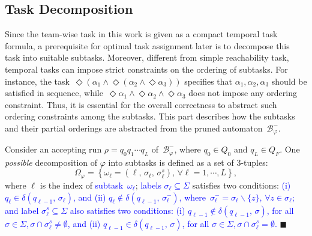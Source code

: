 \subsection{Task Decomposition}\label{subsubsec:task-decompose}
Since the team-wise task in this work is given as a compact temporal task formula,
a prerequisite for optimal task assignment later is to decompose this task into suitable subtasks.
Moreover, different from simple reachability task,
temporal tasks can impose strict constraints on the ordering of subtasks.
For instance, the task~$\Diamond (\alpha_1 \land \Diamond (\alpha_2 \land \Diamond\alpha_3)) $
specifies that $\alpha_1,\alpha_2,\alpha_3$ should be satisfied in sequence,
while~$\Diamond\alpha_1\land\Diamond\alpha_2\land\Diamond\alpha_3$ does not impose any ordering constraint.
Thus, it is essential for the overall correctness to abstract such ordering constraints among the subtasks.
This part describes how the subtasks and their partial orderings are abstracted from the pruned automaton~$\mathcal{B}_{\varphi}^{-}$.

\begin{definition} \label{def:subtasks}
Consider an accepting run $\rho=q_0q_1\cdots q_L$ of~$\mathcal{B}_{\varphi}^{-}$,
where $q_0\in Q_0$ and $q_L\in Q_F$.
One \emph{possible} decomposition of $\varphi$ into subtasks is defined
as a set of 3-tuples:
\begin{equation}\label{eq:subtask}
\Omega_{\varphi} = \left\{\omega_\ell=(\ell,\, \sigma_\ell,\, \sigma^{s}_\ell),\, \forall \ell=1,\cdots,L\right\},
\end{equation}
where $\ell$ is the index of \textcolor{blue}{subtask~$\omega_\ell$};
 \textcolor{blue}{labels $\sigma_\ell\subseteq \Sigma$} satisfies two conditions:
\textcolor{blue}{(i) $q_{\ell} \in \delta(q_{\ell-1},\,\sigma_\ell)$,
and (ii) $q_{\ell} \notin \delta(q_{\ell-1},\,\sigma^-_\ell)$, where~$\sigma^-_\ell =  \sigma_\ell \backslash \{z\}$, $\forall z\in \sigma_\ell$;
and label $\sigma^{s}_\ell\subseteq \Sigma$ also satisfies two conditions:
(i) $q_{\ell-1} \notin \delta(q_{\ell-1},\,\sigma)$, for all $\sigma\in\Sigma, \sigma\cap\sigma^{s}_\ell\neq\emptyset$,
and (ii) $q_{\ell-1} \in \delta(q_{\ell-1},\,\sigma)$, for all  $\sigma\in\Sigma, \sigma\cap\sigma^{s}_\ell=\emptyset$.}
\hfill $\blacksquare$
\end{definition}

